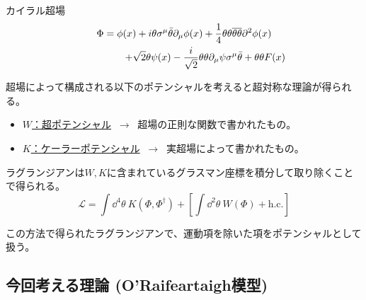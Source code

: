 \documentclass[
  unicode,a4paper,9pt,
  xcolor = {dvipsnames,svgnames},
  hyperref ={colorlinks=true,citecolor=Navy,linkcolor=NavyBlue,urlcolor=purple},
  ja=standard,lualatex
]{beamer}
\begin{document}
\begin{frame}

  カイラル超場
  \begin{gather}
    \Phi
    =
    \phi(x)+i\theta\sigma^{\mu}\bar{\theta}\partial_{\mu}\phi(x)+\frac{1}{4}\theta\theta\overline{\theta\theta}\partial^{2}\phi(x)
    \nonumber
    \\
    \hspace*{1.5cm}
    +\sqrt{2}\theta\psi(x)-\frac{i}{\sqrt{2}}\theta\theta\partial_{\mu}\psi\sigma^{\mu}\bar{\theta}+\theta\theta F(x)
    \nonumber
  \end{gather}

  超場によって構成される以下のポテンシャルを考えると超対称な理論が得られる。
  \begin{itemize}
    \item
          \uline{$W$：超ポテンシャル} $\ \rightarrow\ $ 超場の正則な関数で書かれたもの。
    \item
          \uline{$K$：ケーラーポテンシャル} $\ \rightarrow\ $ 実超場によって書かれたもの。
  \end{itemize}

  ラグランジアンは$W, K$に含まれているグラスマン座標を積分して取り除くことで得られる。
  \begin{equation}
    \mathcal{L}
    =
    \int\dd^4\theta\ K(\Phi,\Phi^{\dag})
    +
    \left[
      \int\dd^2 \theta\ W(\Phi)
      +
      \textrm{h.c.}
      \right]
    \nonumber
  \end{equation}

  この方法で得られたラグランジアンで、運動項を除いた項をポテンシャルとして扱う。

\end{frame}


\subsection{今回考える理論 (O'Raifeartaigh模型)}
\end{document}

